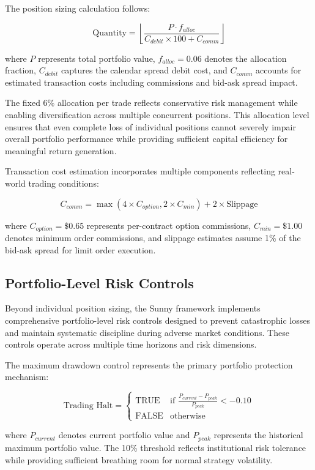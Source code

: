 \documentclass[
  american,
  11pt,
  11pt,
  letterpaper,
  onecolumn]{article}
\begin{document}
The position sizing calculation follows:

\[\text{Quantity} = \left\lfloor \frac{P \cdot f_{alloc}}{C_{debit} \times 100 + C_{comm}} \right\rfloor\]

where \(P\) represents total portfolio value, \(f_{alloc} = 0.06\)
denotes the allocation fraction, \(C_{debit}\) captures the calendar
spread debit cost, and \(C_{comm}\) accounts for estimated transaction
costs including commissions and bid-ask spread impact.

The fixed 6\% allocation per trade reflects conservative risk management
while enabling diversification across multiple concurrent positions.
This allocation level ensures that even complete loss of individual
positions cannot severely impair overall portfolio performance while
providing sufficient capital efficiency for meaningful return
generation.

Transaction cost estimation incorporates multiple components reflecting
real-world trading conditions:

\[C_{comm} = \max(4 \times C_{option}, 2 \times C_{min}) + 2 \times \text{Slippage}\]

where \(C_{option} = \$0.65\) represents per-contract option
commissions, \(C_{min} = \$1.00\) denotes minimum order commissions, and
slippage estimates assume 1\% of the bid-ask spread for limit order
execution.

\subsection{Portfolio-Level Risk
Controls}\label{portfolio-level-risk-controls}

Beyond individual position sizing, the Sunny framework implements
comprehensive portfolio-level risk controls designed to prevent
catastrophic losses and maintain systematic discipline during adverse
market conditions. These controls operate across multiple time horizons
and risk dimensions.

The maximum drawdown control represents the primary portfolio protection
mechanism:

\[\text{Trading Halt} = \begin{cases}
\text{TRUE} & \text{if } \frac{P_{current} - P_{peak}}{P_{peak}} < -0.10 \\
\text{FALSE} & \text{otherwise}
\end{cases}\]

where \(P_{current}\) denotes current portfolio value and \(P_{peak}\)
represents the historical maximum portfolio value. The 10\% threshold
reflects institutional risk tolerance while providing sufficient
breathing room for normal strategy volatility.
\end{document}
